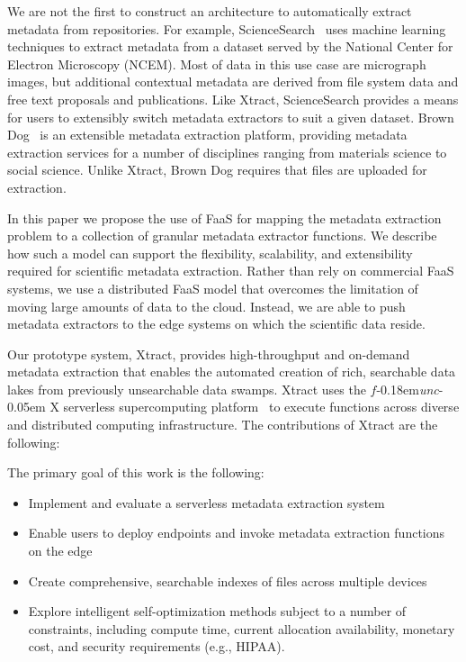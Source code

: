 \documentclass[sigconf]{acmart}
\newcommand{\tyler}[1]{}
\newcommand{\kyle}[1]{}
\newcommand{\tyler}[1]{{\textcolor{cyan}{ tyler: #1 }}}
\newcommand{\kyle}[1]{{\textcolor{purple}{ Kyle: #1 }}}
\newcommand{\name}{Xtract}
\newcommand{\funcx}{$f$\kern-0.18em\emph{unc}\kern-0.05em X}
\begin{document}
\tyler{need to mention the name of our system first} \kyle{Do other papers have a separate RW section?}
We are not the first to construct an architecture to automatically extract metadata from repositories. 
For example, ScienceSearch~\cite{rodrigo2018sciencesearch} uses 
machine learning techniques to extract metadata from a dataset served by the National Center for Electron Microscopy (NCEM). 
Most of data in this use case are micrograph images, but additional contextual metadata are derived from file system 
data and free text proposals and publications. Like \name{}, ScienceSearch 
provides a means for users to extensibly switch metadata extractors to suit a given dataset.  
Brown Dog~\cite{padhy2015brown} is an extensible metadata extraction platform, 
providing metadata extraction services for a number of 
disciplines ranging from materials science to social science.
Unlike \name{}, Brown Dog requires that files are uploaded for extraction. 

In this paper we propose the use of FaaS for mapping the metadata extraction problem to a 
collection of granular metadata extractor functions. 
We describe how such a model can support the flexibility, scalability, and extensibility required
for scientific metadata extraction. 
Rather than rely on commercial FaaS systems, we use a distributed FaaS model 
that overcomes the limitation of moving large amounts of data to the cloud. 
Instead, we are able to push
metadata extractors to the edge systems on which the scientific data reside. 

Our prototype system, \name{}, provides high-throughput and on-demand metadata 
extraction that enables the automated creation of rich, searchable data lakes from previously unsearchable data swamps. 
\name{} uses the \funcx{} serverless supercomputing platform~\cite{chard2019serverless}
to execute functions across diverse and distributed computing infrastructure.
The contributions of \name{} are the following: 



The primary goal of this work is the following: 

\begin{itemize}
\item Implement and evaluate a serverless metadata extraction system
\item Enable users to deploy endpoints and invoke metadata extraction functions on the edge
\item Create comprehensive, searchable indexes of files across multiple devices
\item Explore intelligent self-optimization methods subject to a number of constraints, including compute time, 
current allocation availability, monetary cost, and security requirements (e.g., HIPAA).
\end{itemize}
\end{document}
